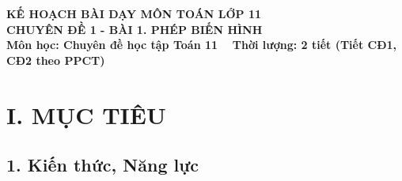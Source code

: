 \documentclass[12pt, a4paper]{article}
\begin{document}
\begin{center}
    {\fontsize{14pt}{17pt}\selectfont \textbf{KẾ HOẠCH BÀI DẠY MÔN TOÁN LỚP 11}}\\[6pt]
    {\fontsize{16pt}{19pt}\selectfont \textbf{CHUYÊN ĐỀ 1 - BÀI 1. PHÉP BIẾN HÌNH}}\\[4pt]
    {\fontsize{12pt}{15pt}\selectfont \textbf{Môn học: Chuyên đề học tập Toán 11} \ \textbar \ \textbf{Thời lượng: 2 tiết (Tiết CĐ1, CĐ2 theo PPCT)}}
\end{center}

\vspace{5pt}

\section*{I. MỤC TIÊU}

\subsection*{1. Kiến thức, Năng lực}
\end{document}
